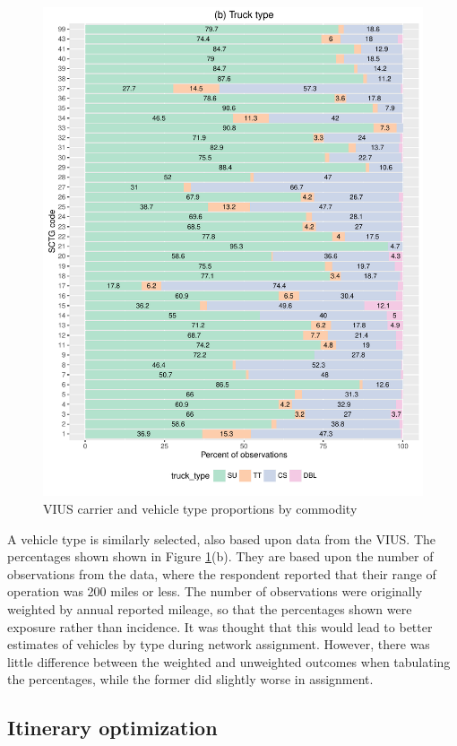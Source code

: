 \begin{figure}
\includegraphics[scale=0.65]{figures/ct-vehicle-types}
\caption{VIUS carrier and vehicle type proportions by commodity}
\label{fig:ct-carrier-vehicle-types}
\end{figure}

A vehicle type is similarly selected, also based upon data from the VIUS. The percentages shown shown in Figure \ref{fig:ct-carrier-vehicle-types}(b). They are based upon the number of observations from the data, where the respondent reported that their range of operation was 200 miles or less. The number of observations were originally weighted by annual reported mileage, so that the percentages shown were exposure rather than incidence. It was thought that this would lead to better estimates of vehicles by type during network assignment. However, there was little difference between the weighted and unweighted outcomes when tabulating the percentages, while the former did slightly worse in assignment.

\subsection{Itinerary optimization}\label{sec:itinerary-optimization}

